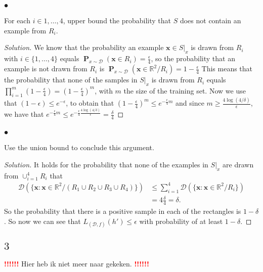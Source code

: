 \documentclass[10pt, a4paper, twoside]{amsart}
\newcommand{\R}{\ensuremath{\mathbb{R}}}
\renewcommand{\P}{\operatorname*{\ensuremath{\mathbf{P}}}}
\newenvironment{solution}
               {\let\oldqedsymbol=\qedsymbol
                \renewcommand{\qedsymbol}{$\blacktriangleleft$}
                \begin{proof}[Solution]}
               {\end{proof}
                \renewcommand{\qedsymbol}{\oldqedsymbol}}
\newcommand{\TODO}{\textcolor{red}{\textbf{!!!!!! }}}
\begin{document}
\subsubsection*{$\bullet$}
For each $i \in {1,\ldots,4}$, upper bound the probability that $S$ does not contain an example from $R_i$.

\begin{solution}
  We know that the probability an example $\mathbf{x} \in S|_x$ is drawn from $R_i$ with $i \in \{1,\ldots, 4\}$ equals $\P_{x\sim\mathcal{D}}(\mathbf{x}\in R_i) = \frac{\epsilon}{4}$, so the probability that an example is not drawn from $R_i$ is $\P_{x\sim\mathcal{D}}(\mathbf{x}\in \R^2/R_i) = 1-\frac{\epsilon}{4}$ This means that the probability that none of the samples in $S|_x$ is drawn from $R_i$ equals $\prod_{i = 1}^m(1-\frac{\epsilon}{4}) = (1-\frac{\epsilon}{4})^m$, with $m$ the size of the training set. Now we use that $(1-\epsilon)\leq e^{-\epsilon}$, to obtain that $(1-\frac{\epsilon}{4})^m \leq e^{- \frac{\epsilon}{4}m}$ and since $m \geq \frac{4\log (4/\delta)}{\epsilon}$, we have that $e^{- \frac{\epsilon}{4}m} \leq e^{-\frac{\epsilon}{4}\frac{4\log (4/\delta)}{\epsilon}}= \frac{\delta}{4}$
\end{solution}

\subsubsection*{$\bullet$}
Use the union bound to conclude this argument. 

\begin{solution}
  It holds for the probability that none of the examples in $S|_x$ are drawn from $\cup_{i=1}^4 R_i$  that
\begin{align*}
  \mathcal{D}(\{\mathbf{x}:\mathbf{x}\in \R^2/(R_1 \cup R_2 \cup R_3 \cup R_4)\}) 
  & \leq \sum_{i=1}^4 \mathcal{D}(\{\mathbf{x}:\mathbf{x}\in \R^2/R_i\}) \\
 & = 4\frac{\delta}{4} = \delta.
\end{align*}
So the probability that there is a positive sample in each of the rectangles is $1-\delta$. So now we can see that $L_{(\mathcal{D},f)}(h')\leq \epsilon$ with probability of at least $1 - \delta$.
\end{solution}

\subsection*{$3$}
\TODO Hier heb ik niet meer naar gekeken. \TODO
\end{document}

